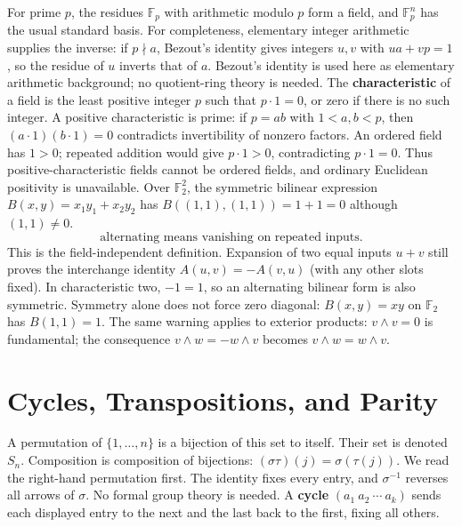 \begin{example}
For prime $p$, the residues $\mathbb F_p$ with arithmetic modulo $p$
form a field, and $\mathbb F_p^n$ has the usual standard basis.
For completeness, elementary integer arithmetic supplies the inverse:
if $p\nmid a$, Bezout's identity gives integers $u,v$ with $ua+vp=1$,
so the residue of $u$ inverts that of $a$. Bezout's identity is used here
as elementary arithmetic background; no quotient-ring theory is needed.
The \textbf{characteristic} of a field is the least positive integer $p$
such that $p\cdot1=0$, or zero if there is no such integer.
A positive characteristic is prime: if $p=ab$ with $1<a,b<p$,
then $(a\cdot1)(b\cdot1)=0$ contradicts invertibility of nonzero factors.
An ordered field has $1>0$; repeated addition would give $p\cdot1>0$,
contradicting $p\cdot1=0$. Thus positive-characteristic fields cannot
be ordered fields, and ordinary Euclidean positivity is unavailable.
Over $\mathbb F_2^2$, the symmetric bilinear expression
$B(x,y)=x_1y_1+x_2y_2$ has
$B((1,1),(1,1))=1+1=0$ although $(1,1)\ne0$.
\[
\boxed{\text{alternating means vanishing on repeated inputs}.}
\]
This is the field-independent definition. Expansion of
two equal inputs $u+v$ still proves the interchange identity $A(u,v)=-A(v,u)$
(with any other slots fixed). In characteristic two, $-1=1$, so an
alternating bilinear form is also symmetric. Symmetry alone does not force
zero diagonal: $B(x,y)=xy$ on $\mathbb F_2$ has $B(1,1)=1$.
The same warning applies to exterior products: $v\wedge v=0$ is fundamental;
the consequence $v\wedge w=-w\wedge v$ becomes $v\wedge w=w\wedge v$.
\end{example}

\section{Cycles, Transpositions, and Parity}
A permutation of $\{1,\ldots,n\}$ is a bijection of this set to itself.
Their set is denoted $S_n$. Composition is composition of bijections:
$(\sigma\tau)(j)=\sigma(\tau(j))$. We read the right-hand permutation
first. The identity fixes every entry, and $\sigma^{-1}$ reverses all
arrows of $\sigma$. No formal group theory is needed.
A \textbf{cycle} $(a_1\ a_2\ \cdots\ a_k)$ sends each displayed entry
to the next and the last back to the first, fixing all others.

